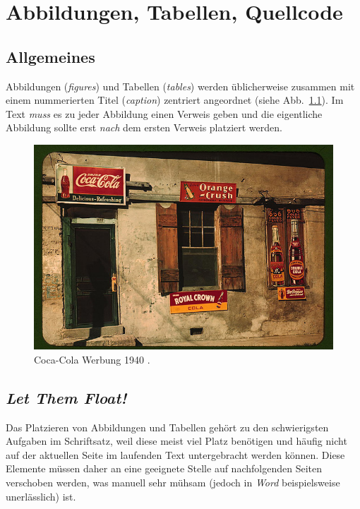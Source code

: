 \chapter{Abbildungen, Tabellen, Quellcode}
\label{cha:Abbildungen}

\section{Allgemeines}

Abbildungen (\emph{figures}) und Tabellen (\emph{tables}) werden üblicherweise
zusammen mit einem nummerierten Titel (\emph{caption}) zentriert
angeordnet (siehe Abb.~\ref{fig:CocaCola}).
Im Text \emph{muss} es zu jeder Abbildung einen Verweis geben und die eigentliche Abbildung
sollte erst \emph{nach} dem ersten Verweis platziert werden.

\begin{figure}
\centering
\includegraphics[width=.95\textwidth]{cola-public-domain-photo-p} %
\caption{Coca-Cola Werbung 1940 \cite{CocaCola1940}.}
\label{fig:CocaCola}
\end{figure}



\section{\emph{Let Them Float!}}

Das Platzieren von Abbildungen und Tabellen gehört zu den
schwierigsten Aufgaben im Schriftsatz, weil diese meist viel Platz
benötigen und häufig nicht auf der aktuellen Seite im laufenden
Text untergebracht werden können. Diese Elemente müssen daher an
eine geeignete Stelle auf nachfolgenden Seiten verschoben werden,
was manuell sehr mühsam (jedoch in \emph{Word} beispielsweise unerlässlich) ist.

